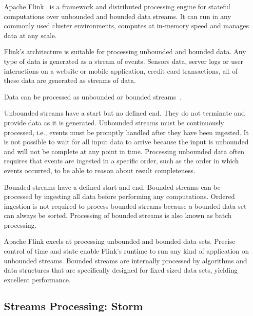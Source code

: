 Apache Flink~\cite{misc:ApacheFlink} is a framework and distributed processing engine for stateful computations over unbounded and bounded data streams. It can run in any commonly used cluster environments, computes at in-memory speed and manages data at any scale.

Flink’s architecture is suitable for processing unbounded and bounded data. Any type of data is generated as a stream of events. Sensors data, server logs or user interactions on a website or mobile application, credit card transactions, all of these data are generated as streams of data.

Data can be processed as unbounded or bounded streams~\cite{misc:ApacheFlinkArchitecture}. 

Unbounded streams have a start but no defined end. They do not terminate and provide data as it is generated. Unbounded streams must be continuously processed, i.e., events must be promptly handled after they have been ingested. It is not possible to wait for all input data to arrive because the input is unbounded and will not be complete at any point in time. Processing unbounded data often requires that events are ingested in a specific order, such as the order in which events occurred, to be able to reason about result completeness.

Bounded streams have a defined start and end. Bounded streams can be processed by ingesting all data before performing any computations. Ordered ingestion is not required to process bounded streams because a bounded data set can always be sorted. Processing of bounded streams is also known as batch processing.


Apache Flink excels at processing unbounded and bounded data sets. Precise control of time and state enable Flink’s runtime to run any kind of application on unbounded streams. Bounded streams are internally processed by algorithms and data structures that are specifically designed for fixed sized data sets, yielding excellent performance.

\subsection{Streams Processing: Storm}\label{sec:storm}

